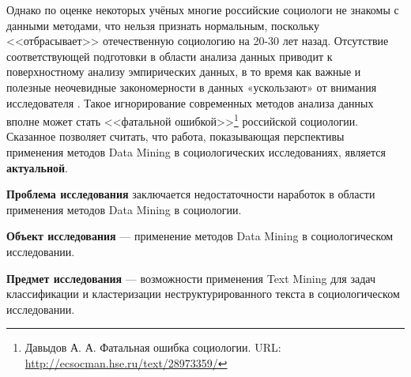 Однако по оценке некоторых учёных многие российские социологи не знакомы с данными методами, что нельзя признать нормальным, поскольку <<отбрасывает>> отечественную социологию на 20-30 лет назад. Отсутствие соответствующей подготовки в области анализа данных приводит к поверхностному анализу эмпирических данных, в то время как важные и полезные неочевидные закономерности в данных «ускользают» от внимания исследователя \cite{Davydov_Knowledge}. Такое игнорирование современных методов анализа данных вполне может стать <<фатальной ошибкой>>\footnote{Давыдов А. А. Фатальная ошибка социологии. URL: \url{http://ecsocman.hse.ru/text/28973359/}} российской социологии. Сказанное позволяет считать, что работа, показывающая перспективы применения методов Data Mining в социологических исследованиях, является \textbf{актуальной}. 

\textbf{Проблема исследования} заключается недостаточности наработок в области применения методов Data Mining в социологии.

\textbf{Объект исследования} --- применение методов Data Mining в социологическом исследовании.

\textbf{Предмет исследования} --- возможности применения Text Mining для задач классификации и кластеризации неструктурированного текста в социологическом исследовании.
\clearpage